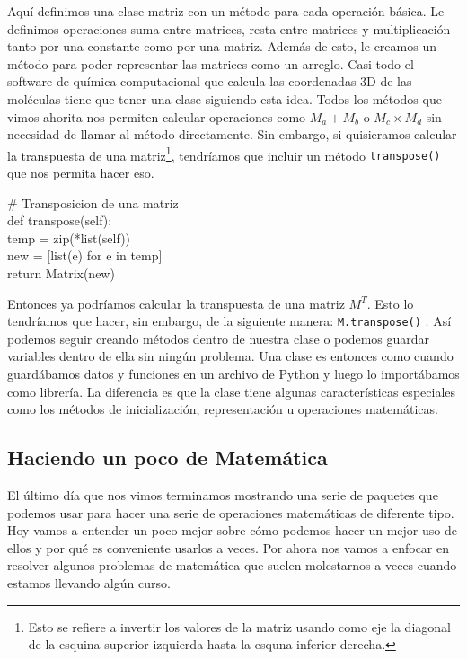 \documentclass[10pt,letterpaper]{article}
\newcommand{\inlinecode}[1]{
\colorbox{light-gray}{\texttt{#1}}
}
\newenvironment{Code}
{
\begin{lrbox}{\selvestebox}%
\begin{minipage}{\dimexpr\columnwidth-2\fboxsep\relax}
\fontfamily{\ttdefault}\selectfont
}
{\end{minipage}\end{lrbox}%
\begin{center}
\colorbox{light-gray}{\usebox{\selvestebox}}
\end{center}
}
\begin{document}
Aqu\'i definimos una clase matriz con un m\'etodo para cada operaci\'on b\'asica. Le definimos operaciones suma entre matrices, resta entre matrices y multiplicaci\'on tanto por una constante como por una matriz. Adem\'as de esto, le creamos un m\'etodo para poder representar las matrices como un arreglo. Casi todo el software de qu\'imica computacional que calcula las coordenadas 3D de las mol\'eculas tiene que tener una clase siguiendo esta idea. Todos los m\'etodos que vimos ahorita nos permiten calcular operaciones como $M_a + M_b$ o $M_c \times M_d$ sin necesidad de llamar al m\'etodo directamente. Sin embargo, si quisieramos calcular la transpuesta de una matriz\footnote{Esto se refiere a invertir los valores de la matriz usando como eje la diagonal de la esquina superior izquierda hasta la esquna inferior derecha.}, tendr\'iamos que incluir un m\'etodo \inlinecode{transpose()} que nos permita hacer eso.

\begin{footnotesize}
\begin{Code}
\# Transposicion de una matriz\\
def transpose(self):\\
\hspace*{5mm} temp = zip(*list(self))\\
\hspace*{5mm} new = [list(e) for e in temp]\\
\hspace*{5mm} return Matrix(new)
\end{Code}
\end{footnotesize}

Entonces ya podr\'iamos calcular la transpuesta de una matriz $M^T$. Esto lo tendr\'iamos que hacer, sin embargo, de la siguiente manera: \inlinecode{M.transpose()}. As\'i podemos seguir creando m\'etodos dentro de nuestra clase o podemos guardar variables dentro de ella sin ning\'un problema. Una clase es entonces como cuando guard\'abamos datos y funciones en un archivo de Python y luego lo import\'abamos como librer\'ia. La diferencia es que la clase tiene algunas caracter\'isticas especiales como los m\'etodos de inicializaci\'on, representaci\'on u operaciones matem\'aticas.

\subsection{Haciendo un poco de Matem\'atica}
El \'ultimo d\'ia que nos vimos terminamos mostrando una serie de paquetes que podemos usar para hacer una serie de operaciones matem\'aticas de diferente tipo. Hoy vamos a entender un poco mejor sobre c\'omo podemos hacer un mejor uso de ellos y por qu\'e es conveniente usarlos a veces. Por ahora nos vamos a enfocar en resolver algunos problemas de matem\'atica que suelen molestarnos a veces cuando estamos llevando alg\'un curso.\\
\end{document}
